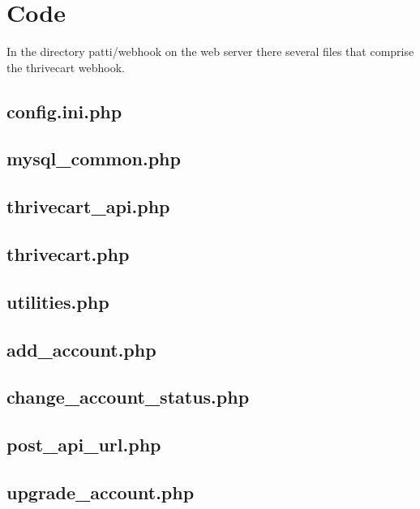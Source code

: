 \documentclass[final,letterpaper,12pt]{article}
\begin{document}
\newpage
\section{Code}
\noindent In the directory patti/webhook on the web server there several files that comprise the thrivecart webhook.
\subsection{config.ini.php}
\subsection{mysql\_common.php}
\subsection{thrivecart\_api.php}
\subsection{thrivecart.php}
\subsection{utilities.php}
\subsection{add\_account.php}
\subsection{change\_account\_status.php}
\subsection{post\_api\_url.php}
\subsection{upgrade\_account.php}
\end{document}
